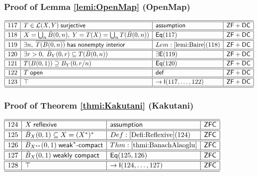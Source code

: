 \documentclass[11pt,reqno]{amsart}
\begin{document}
\medskip

\subsubsection*{Proof of Lemma \ref{lemi:OpenMap} (\textsf{OpenMap})}

\noindent$%
\begin{array}{|r|l|l|l|}
\hline\hline
117 & T\in\mathcal{L}(X,Y)\;\mathsf{surjective} & \mathsf{assumption} & \mathsf{ZF+DC} \\ \hline\hline
118 & X=\bigcup_{n}\bar{B}(0,n),\;Y=T(X)=\bigcup_{n}T(\bar{B}(0,n)) & \mathsf{Eq}(117) & \mathsf{ZF+DC} \\ \hline\hline
119 & \exists n,\;\overline{T(B(0,n))}\;\mathsf{has\ nonempty\ interior} & Lem:\ref{lemi:Baire}(118) & \mathsf{ZF+DC} \\ \hline\hline
120 & \exists r>0,\;\bar{B}_{Y}(0,r)\subseteq T(\bar{B}(0,n)) & \exists\mathsf{E}(119) & \mathsf{ZF+DC} \\ \hline\hline
121 & T(B(0,1))\supseteq B_{Y}(0,r/n) & \mathsf{Eq}(120) & \mathsf{ZF+DC} \\ \hline\hline
122 & T\;\mathsf{open} & \mathsf{def} & \mathsf{ZF+DC} \\ \hline\hline
123 & \top & \to\mathsf{I}(117,\dots,122) & \mathsf{ZF+DC} \\ \hline\hline
\end{array}%
$

\medskip

\subsubsection*{Proof of Theorem \ref{thmi:Kakutani} (\textsf{Kakutani})}

\noindent$%
\begin{array}{|r|l|l|l|}
\hline\hline
124 & X\;\mathsf{reflexive} & \mathsf{assumption} & \mathsf{ZFC} \\ \hline\hline
125 & \bar{B}_{X}(0,1)\subseteq X=(X^{*})^{*} & Def:\ref{Defi:Reflexive}(124) & \mathsf{ZFC} \\ \hline\hline
126 & \bar{B}_{X^{**}}(0,1)\;\mathsf{weak}^{\ast}\text{-}\mathsf{compact} & Thm:\ref{thmi:BanachAlaoglu} & \mathsf{ZFC} \\ \hline\hline
127 & \bar{B}_{X}(0,1)\;\mathsf{weakly\ compact} & \mathsf{Eq}(125,126) & \mathsf{ZFC} \\ \hline\hline
128 & \top & \to\mathsf{I}(124,\dots,127) & \mathsf{ZFC} \\ \hline\hline
\end{array}%
$
\end{document}
